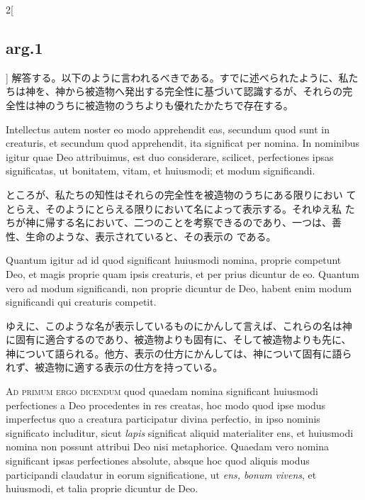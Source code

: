 \documentclass[paper=a4paper,fontsize=10pt,jafontsize=9pt,titlepage]{jlreq}
\begin{document}
\begin{paracol}{2}[\subsection{arg.1}]
解答する。以下のように言われるべきである。すでに述べられたように、私た
ちは神を、神から被造物へ発出する完全性に基づいて認識するが、それらの完
全性は神のうちに被造物のうちよりも優れたかたちで存在する。

\switchcolumn*

Intellectus autem noster eo modo apprehendit eas, secundum
quod sunt in creaturis, et secundum quod apprehendit, ita significat
per nomina. In nominibus igitur quae Deo attribuimus, est duo
considerare, scilicet, perfectiones ipsas significatas, ut bonitatem,
 vitam, et huiusmodi; et modum significandi.

\switchcolumn

ところが、私たちの知性はそれらの完全性を被造物のうちにある限りにおい
てとらえ、そのようにとらえる限りにおいて名によって表示する。それゆえ私
たちが神に帰する名において、二つのことを考察できるのであり、一つは、善
性、生命のような、表示されていると、その表示の
である。

\switchcolumn*

Quantum igitur ad id quod significant huiusmodi nomina, proprie
competunt Deo, et magis proprie quam ipsis creaturis, et per prius
dicuntur de eo. Quantum vero ad modum significandi, non proprie
dicuntur de Deo, habent enim modum significandi qui creaturis
competit.

\switchcolumn

ゆえに、このような名が表示しているものにかんして言えば、これらの名は神
に固有に適合するのであり、被造物よりも固有に、そして被造物よりも先に、
神について語られる。他方、表示の仕方にかんしては、神について固有に語ら
れず、被造物に適する表示の仕方を持っている。

\switchcolumn*[\subsection{ad.1}]

{\scshape Ad primum ergo dicendum} quod quaedam nomina significant
huiusmodi perfectiones a Deo procedentes in res creatas, hoc modo quod
ipse modus imperfectus quo a creatura participatur divina perfectio,
in ipso nominis significato includitur, sicut {\itshape lapis} significat
aliquid materialiter ens, et huiusmodi nomina non possunt attribui Deo
nisi metaphorice. Quaedam vero nomina significant ipsas perfectiones
absolute, absque hoc quod aliquis modus participandi claudatur in
eorum significatione, ut {\itshape ens, bonum vivens}, et huiusmodi, et
talia proprie dicuntur de Deo.


\end{paracol}
\end{document}
